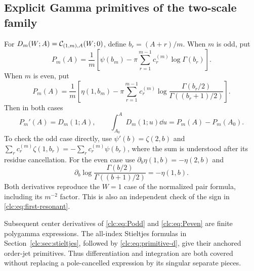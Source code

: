 \subsection{Explicit Gamma primitives of the two-scale family}
For $D_m(W;A)=\mathcal C_{(1,m),A}(W;0)$, define $b_r=(A+r)/m$.
When $m$ is odd, put
\begin{equation}\label{clc:eq:Podd}
 P_m(A)=\frac1m\left[\psi(b_m)
                  -\pi\sum_{r=1}^{m-1}c_r^{(m)}\log\Gamma(b_r)\right].
\end{equation}
When $m$ is even, put
\begin{equation}\label{clc:eq:Peven}
 P_m(A)=\frac1m\left[\eta(1,b_m)-\pi\sum_{r=1}^{m-1}c_r^{(m)}
 \log\frac{\Gamma(b_r/2)}{\Gamma((b_r+1)/2)}\right].
\end{equation}
Then in both cases
\begin{equation}\label{clc:eq:Pderivative}
 P_m'(A)=D_m(1;A),\qquad
 \int_{A_0}^AD_m(1;u)\dd u=P_m(A)-P_m(A_0).
\end{equation}
To check the odd case directly, use
$\psi'(b)=\zeta(2,b)$ and
$\sum_rc_r^{(m)}\zeta(1,b_r)=-\sum_rc_r^{(m)}\psi(b_r)$,
where the sum is understood after its residue cancellation.
For the even case use
$\partial_b\eta(1,b)=-\eta(2,b)$ and
\[
 \partial_b\log\frac{\Gamma(b/2)}{\Gamma((b+1)/2)}=-\eta(1,b).
\]
Both derivatives reproduce the $W=1$ case of the normalized pair formula,
including its $m^{-2}$ factor. This is also an independent check of the
sign in \eqref{clc:eq:first-resonant}.

Subsequent center derivatives of \eqref{clc:eq:Podd} and
\eqref{clc:eq:Peven} are finite polygamma expressions. The all-index
Stieltjes formulas in Section~\ref{clc:sec:stieltjes}, followed by
\eqref{clc:eq:primitive-d}, give their anchored order-jet primitives.
Thus differentiation and integration are both covered without replacing
a pole-cancelled expression by its singular separate pieces.
